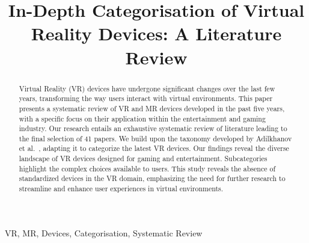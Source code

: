 \documentclass[conference]{IEEEtran}
\begin{document}
	
	
	\title{In-Depth Categorisation of Virtual Reality Devices: A Literature Review}
	
	\author{}
	\author{
	}
	
	\maketitle
	
	\begin{abstract}
		
		Virtual Reality (VR) devices have undergone significant changes over the last few years, transforming the way users interact with virtual environments. This paper presents a systematic review of VR and MR devices developed in the past five years, with a specific focus on their application within the entertainment and gaming industry. Our research entails an exhaustive systematic review of literature leading to the final selection of 41 papers. We build upon the taxonomy developed by Adilkhanov et al.~\cite{Adilkhanov22}, adapting it to categorize the latest VR devices. Our findings reveal the diverse landscape of VR devices designed for gaming and entertainment. Subcategories highlight the complex choices available to users. This study reveals the absence of standardized devices in the VR domain, emphasizing the need for further research to streamline and enhance user experiences in virtual environments.
		
	\end{abstract}
	
	\begin{IEEEkeywords}
		VR, MR, Devices, Categorisation, Systematic Review
	\end{IEEEkeywords}
	
	
	
	
	
	
	
	
	
	
	
	\appendix
	\newpage
	
	
\end{document}
